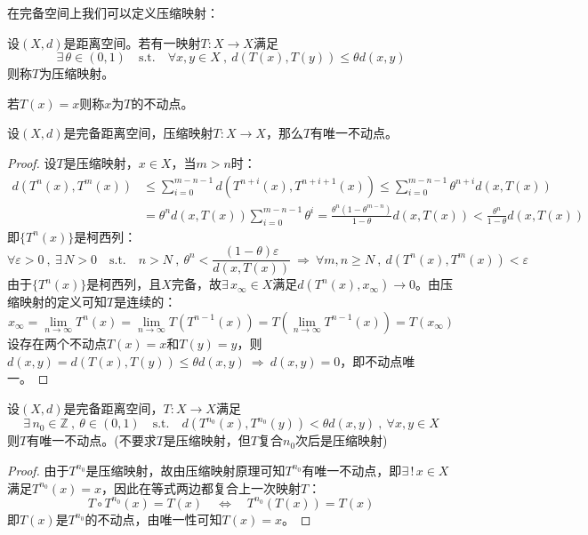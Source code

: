 在完备空间上我们可以定义压缩映射：
\begin{definition}[压缩映射]
    设$(X,d)$是距离空间。若有一映射$T:X \to X$满足
    \[\exists \, \theta \in (0,1) \quad \text{s.t.} \quad \forall x,y \in X \ , \ d(T(x),T(y)) \leq \theta d(x,y)\]
    则称$T$为压缩映射。
\end{definition}
\begin{definition}[不动点]
    若$T(x)=x$则称$x$为$T$的不动点。
\end{definition}
\begin{theorem}[压缩映射原理]
    设$(X,d)$是完备距离空间，压缩映射$T:X \to X$，那么$T$有唯一不动点。
\end{theorem}
\begin{proof}设$T$是压缩映射，$x \in X$，当$m>n$时：
\begin{equation*}
    \begin{aligned}
        d(T^n(x),T^m(x)) & \leq \sum_{i=0}^{m-n-1}d(T^{n+i}(x),T^{n+i+1}(x)) \leq \sum_{i=0}^{m-n-1}\theta^{n+i}d(x,T(x)) \\
        & =\theta^nd(x,T(x))\sum_{i=0}^{m-n-1}\theta^i=\frac{\theta^n(1-\theta^{m-n})}{1-\theta}d(x,T(x)) < \frac{\theta^n}{1-\theta}d(x,T(x))
    \end{aligned}
\end{equation*}
即$\{T^n(x)\}$是柯西列：
\[\forall \varepsilon>0 \ , \ \exists \, N>0 \quad \text{s.t.} \quad n>N \ , \ \theta^n<\frac{(1-\theta)\varepsilon}{d(x,T(x))} \ \Rightarrow \ \forall m,n \geq N \ , \ d(T^n(x),T^m(x))<\varepsilon\]
由于$\{T^n(x)\}$是柯西列，且$X$完备，故$\exists \, x_{\infty} \in X$满足$d(T^n(x),x_{\infty}) \to 0$。由压缩映射的定义可知$T$是连续的：
\[x_{\infty}=\lim_{n \to \infty}T^n(x)=\lim_{n \to \infty}T(T^{n-1}(x))=T(\lim_{n \to \infty}T^{n-1}(x))=T(x_{\infty})\]
设存在两个不动点$T(x)=x$和$T(y)=y$，则$d(x,y)=d(T(x),T(y)) \leq \theta d(x,y) \ \Rightarrow \ d(x,y)=0$，即不动点唯一。
\end{proof}
\begin{lemma}[推广的压缩映射原理]
设$(X,d)$是完备距离空间，$T:X \to X$满足
\[\exists \, n_0 \in \mathbb{Z} \ , \ \theta \in (0,1) \quad \text{s.t.} \quad d(T^{n_0}(x),T^{n_0}(y))<\theta d(x,y) \ , \ \forall x,y \in X\]
则$T$有唯一不动点。(不要求$T$是压缩映射，但$T$复合$n_0$次后是压缩映射)
\end{lemma}
\begin{proof}由于$T^{n_0}$是压缩映射，故由压缩映射原理可知$T^{n_0}$有唯一不动点，即$\exists \, ! \, x \in X$满足$T^{n_0}(x)=x$，因此在等式两边都复合上一次映射$T$：
\[T \circ T^{n_0}(x)=T(x) \quad \Leftrightarrow \quad T^{n_0}(T(x))=T(x)\]
即$T(x)$是$T^{n_0}$的不动点，由唯一性可知$T(x)=x$。
\end{proof}

